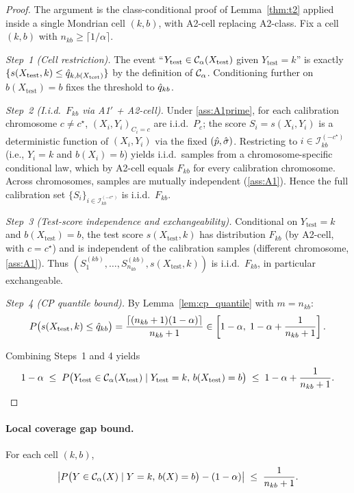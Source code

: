 \begin{proof}
The argument is the class-conditional proof of Lemma~\ref{thm:t2} applied inside a single Mondrian cell $(k, b)$, with A2-cell replacing A2-class. Fix a cell $(k, b)$ with $n_{kb} \geq \lceil 1/\alpha \rceil$.

\textit{Step~1 (Cell restriction).}
The event ``$Y_{\mathrm{test}} \in \mathcal{C}_\alpha(X_{\mathrm{test}})$ given $Y_{\mathrm{test}} = k$'' is exactly $\{s(X_{\mathrm{test}}, k) \leq \hat{q}_{k, b(X_{\mathrm{test}})}\}$ by the definition of $\mathcal{C}_\alpha$. Conditioning further on $b(X_{\mathrm{test}}) = b$ fixes the threshold to $\hat{q}_{kb}$.

\textit{Step~2 (I.i.d.\ $F_{kb}$ via A1$'$ + A2-cell).}
Under \ref{ass:A1prime}, for each calibration chromosome $c \neq c^\star$, $(X_i, Y_i)_{C_i = c}$ are i.i.d.\ $P_c$; the score $S_i = s(X_i, Y_i)$ is a deterministic function of $(X_i, Y_i)$ via the fixed $(\hat{p}, \hat{\sigma})$. Restricting to $i \in \mathcal{I}_{kb}^{(-c^\star)}$ (i.e., $Y_i = k$ and $b(X_i) = b$) yields i.i.d.\ samples from a chromosome-specific conditional law, which by A2-cell equals $F_{kb}$ for every calibration chromosome. Across chromosomes, samples are mutually independent (\ref{ass:A1}). Hence the full calibration set $\{S_i\}_{i \in \mathcal{I}_{kb}^{(-c^\star)}}$ is i.i.d.\ $F_{kb}$.

\textit{Step~3 (Test-score independence and exchangeability).}
Conditional on $Y_{\mathrm{test}} = k$ and $b(X_{\mathrm{test}}) = b$, the test score $s(X_{\mathrm{test}}, k)$ has distribution $F_{kb}$ (by A2-cell, with $c = c^\star$) and is independent of the calibration samples (different chromosome, \ref{ass:A1}). Thus $(S_1^{(kb)}, \ldots, S_{n_{kb}}^{(kb)}, s(X_{\mathrm{test}}, k))$ is i.i.d.\ $F_{kb}$, in particular exchangeable.

\textit{Step~4 (CP quantile bound).}
By Lemma~\ref{lem:cp_quantile} with $m = n_{kb}$:
\[
P\bigl(s(X_{\mathrm{test}}, k) \leq \hat{q}_{kb}\bigr)
= \frac{\lceil (n_{kb} + 1)(1-\alpha)\rceil}{n_{kb} + 1}
\in \left[1 - \alpha,\; 1 - \alpha + \frac{1}{n_{kb} + 1}\right].
\]

Combining Steps~1 and 4 yields
\[
1 - \alpha \;\leq\; P\bigl(Y_{\mathrm{test}} \in \mathcal{C}_\alpha(X_{\mathrm{test}}) \mid Y_{\mathrm{test}} = k,\, b(X_{\mathrm{test}}) = b\bigr) \;\leq\; 1 - \alpha + \frac{1}{n_{kb} + 1}. \qedhere
\]
\end{proof}

\paragraph{Local coverage gap bound.}
For each cell $(k, b)$,
\[
\left| P\bigl(Y \in \mathcal{C}_\alpha(X) \mid Y = k,\, b(X) = b\bigr) - (1 - \alpha)\right| \;\leq\; \frac{1}{n_{kb} + 1}.
\]



